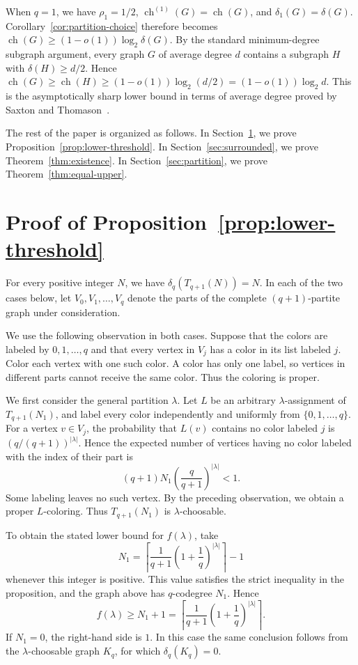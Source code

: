 \documentclass[12pt]{article}
\numberwithin{equation}{section}
\theoremstyle{definition}
\begin{document}
When $q=1$, we have $\rho_1=1/2$,
$\operatorname{ch}^{(1)}(G)=\operatorname{ch}(G)$, and
$\delta_1(G)=\delta(G)$. Corollary~\ref{cor:partition-choice} therefore
becomes $\operatorname{ch}(G)\geq(1-o(1))\log_2\delta(G)$. By the standard
minimum-degree subgraph argument, every graph $G$ of average degree $d$
contains a subgraph $H$ with $\delta(H)\geq d/2$. Hence
$\operatorname{ch}(G)\geq\operatorname{ch}(H)
\geq(1-o(1))\log_2(d/2)=(1-o(1))\log_2d$. This is the asymptotically sharp
lower bound in terms of average degree proved by Saxton and
Thomason~\cite{ST2015}.

The rest of the paper is organized as follows. In
Section~\ref{sec:complete-multipartite}, we prove
Proposition~\ref{prop:lower-threshold}. In Section~\ref{sec:surrounded}, we
prove Theorem~\ref{thm:existence}.
In Section~\ref{sec:partition}, we prove Theorem~\ref{thm:equal-upper}.
 
\section{Proof of Proposition~\ref{prop:lower-threshold}}
\label{sec:complete-multipartite}
 
For every positive integer $N$, we have $\delta_q(T_{q+1}(N))=N$.
In each of the two cases below, let $V_0,V_1,\ldots,V_q$ denote the parts of
the complete $(q+1)$-partite graph under consideration.

We use the following observation in both cases. Suppose that the colors are
labeled by $0,1,\ldots,q$ and that every vertex in $V_j$ has a color in its
list labeled $j$. Color each vertex with one such color. A color has only one
label, so vertices in different parts cannot receive the same color. Thus the
coloring is proper.

We first consider the general partition $\lambda$. Let $L$ be an arbitrary
$\lambda$-assignment of $T_{q+1}(N_1)$, and label every color independently
and uniformly from $\{0,1,\ldots,q\}$. For a vertex $v\in V_j$, the
probability that $L(v)$ contains no color labeled $j$ is
$(q/(q+1))^{|\lambda|}$.
Hence the expected number of vertices having no color labeled with the index
of their part is
\[
 (q+1)N_1\left(\frac{q}{q+1}\right)^{|\lambda|}<1.
\]
Some labeling leaves no such vertex. By the preceding observation, we obtain
a proper $L$-coloring. Thus $T_{q+1}(N_1)$ is $\lambda$-choosable.

To obtain the stated lower bound for $f(\lambda)$, take
\[
 N_1=
 \left\lceil
 \frac{1}{q+1}\left(1+\frac1q\right)^{|\lambda|}
 \right\rceil-1
\]
whenever this integer is positive. This value satisfies the strict inequality
in the proposition, and the graph above has $q$-codegree $N_1$. Hence
\[
 f(\lambda)\geq N_1+1
 =\left\lceil
 \frac{1}{q+1}\left(1+\frac1q\right)^{|\lambda|}
 \right\rceil.
\]
If $N_1=0$, the right-hand side is $1$. In this case the same conclusion
follows from the $\lambda$-choosable graph $K_q$, for which
$\delta_q(K_q)=0$.
\end{document}
